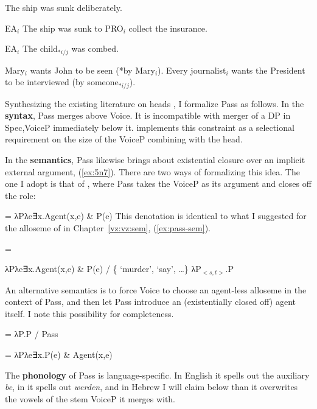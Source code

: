 \begin{exe}
\begin{xlist}
\begin{exe}
\ex  \label{ex:pass-adv-en}The ship was sunk deliberately. 

\ex  \label{ex:pass-pro-en}EA$_i$ The ship was sunk to PRO$_i$ collect the insurance. 

\ex  \label{ex:pass-dre-en}EA$_i$ The child$_{*i/j}$ was combed. 

 \ex  \label{ex:pass-bind-en} 
 \begin{xlist} 
 	\ex  Mary$_i$ wants John to be seen (*by Mary$_i$). 
 	\ex  Every journalist$_i$ wants the President to be interviewed (by someone$_{*i/j}$). 
 \z
\z 

Synthesizing the existing literature on  heads \citep{bruening13,layering15}, I formalize Pass as follows. In the \textbf{syntax}, Pass merges above Voice. It is incompatible with merger of a DP in Spec,VoiceP immediately below it. \cite{bruening13} implements this constraint as a selectional requirement on the size of the VoiceP combining with the  head.

In the \textbf{semantics}, Pass likewise brings about existential closure over an implicit external argument, (\ref{ex:5n7}). There are two ways of formalizing this idea. The one I adopt is that of \cite{bruening13}, where Pass takes the VoiceP as its argument and closes off the  role:
 \begin{exe}
\ex  \label{ex:5n7} = λPλe∃x.Agent(x,e) \& P(e) 
 \z 
This denotation is identical to what I suggested for the  alloseme of {\vz} in Chapter~\ref{vz:vz:sem}, (\ref{ex:pass-sem}).
 \begin{exe}
	\ex  \label{ex:pass-sem}\denote{\vz} = 
	\begin{xlist}
		\ex λPλe∃x.Agent(x,e) \& P(e) / \{ `murder',  ‘say’, \dots\} 
		\ex λP$_{<s,t>}$.P
		\z
	\z 

An alternative semantics is to force Voice to choose an agent-less alloseme in the context of Pass, and then let Pass introduce an (existentially closed off) agent itself. I note this possibility for completeness.
 \begin{exe}
\ex  {} = λP.P / Pass \trace 

\ex  {} = λPλe∃x.P(e) \& Agent(x,e) 
 \z 

The \textbf{phonology} of Pass is language-specific. In English it spells out the auxiliary \emph{be}, in  it spells out \emph{werden}, and in Hebrew I will claim below than it overwrites the vowels of the stem VoiceP it merges with.



\end{exe}
\end{xlist}
\end{exe}
\end{exe}
\end{xlist}
\end{exe}
\end{xlist}
\end{exe}
